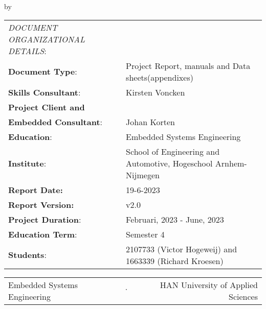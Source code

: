 \begin{titlepage}

\begin{center}

{\makeatletter
\largetitlestyle\fontsize{45}{45}\selectfont\@title
\makeatother}

\bigskip

{\makeatletter
\vspace{12mm}
\ifdefvoid{\@subtitle}{}{\largetitlestyle\fontsize{20}{20}\selectfont\@subtitle}
\makeatother}

\bigskip
\bigskip

by

\bigskip
\bigskip

{\makeatletter
\largetitlestyle\fontsize{25}{25}\selectfont\@author
\makeatother}

\bigskip
\bigskip



\vfill

\begin{tabular}{ll}
\textit{DOCUMENT ORGANIZATIONAL DETAILS}:       \\
\textbf{Document Type}: & Project Report, manuals and Data sheets(appendixes)\\
\textbf{Skills Consultant}:                          & Kirsten Voncken \\ 
\textbf{Project Client and}\\ \textbf{Embedded Consultant}:                    & Johan Korten \\
\textbf{Education}:                          & Embedded Systems Engineering \\
\textbf{Institute}:                          & School of Engineering and Automotive, Hogeschool Arnhem-Nijmegen\\
\textbf{Report Date:} & 19-6-2023\\
\textbf{Report Version:} & v2.0\\
\textbf{Project Duration}: & Februari, 2023 - June, 2023 \\
\textbf{Education Term}: &Semester 4\\
\textbf{Students}: & 2107733 (Victor Hogeweij) and 1663339 (Richard Kroesen)\\
\end{tabular}

\vspace*{1cm}


\vspace*{2cm}
  \begin{center}
    \begin{tabular}{lcr}
      Embedded Systems Engineering & $\cdot$ & HAN University of Applied Sciences
    \end{tabular}
  \end{center}

\end{center}

\end{titlepage}
